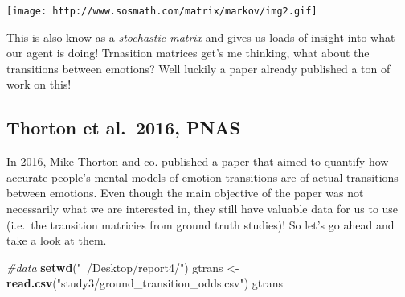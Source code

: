 \documentclass[
]{article}
\newenvironment{Shaded}{\begin{snugshade}}{\end{snugshade}}
\newcommand{\CommentTok}[1]{\textcolor[rgb]{0.56,0.35,0.01}{\textit{#1}}}
\newcommand{\KeywordTok}[1]{\textcolor[rgb]{0.13,0.29,0.53}{\textbf{#1}}}
\newcommand{\NormalTok}[1]{#1}
\newcommand{\StringTok}[1]{\textcolor[rgb]{0.31,0.60,0.02}{#1}}
\begin{document}
\texttt{[image: http://www.sosmath.com/matrix/markov/img2.gif]}

This is also know as a \emph{stochastic matrix} and gives us loads of
insight into what our agent is doing! Trnasition matrices get's me
thinking, what about the transitions between emotions? Well luckily a
paper already published a ton of work on this!

\hypertarget{thorton-et-al.-2016-pnas}{%
\subsection{Thorton et al.~2016, PNAS}\label{thorton-et-al.-2016-pnas}}

In 2016, Mike Thorton and co. published a paper that aimed to quantify
how accurate people's mental models of emotion transitions are of actual
transitions between emotions. Even though the main objective of the
paper was not necessarily what we are interested in, they still have
valuable data for us to use (i.e.~the transition matricies from ground
truth studies)! So let's go ahead and take a look at them.

\begin{Shaded}
\begin{Highlighting}[]
\CommentTok{#data}
\KeywordTok{setwd}\NormalTok{(}\StringTok{"~/Desktop/report4/"}\NormalTok{)}
\NormalTok{gtrans <-}\StringTok{ }\KeywordTok{read.csv}\NormalTok{(}\StringTok{"study3/ground_transition_odds.csv"}\NormalTok{)}
\NormalTok{gtrans}
\end{Highlighting}
\end{Shaded}
\end{document}
